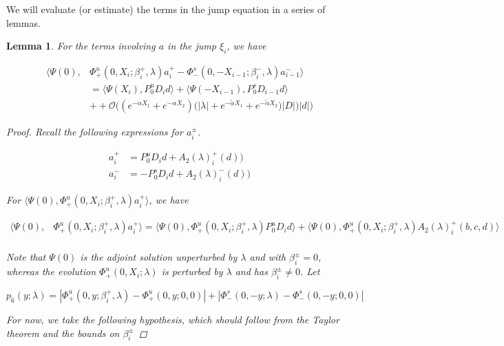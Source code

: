 \documentclass[12pt]{article}
\newtheorem{lemma}{Lemma}
\begin{document}
We will evaluate (or estimate) the terms in the jump equation in a series of lemmas.


\begin{lemma}\label{jumpa}
For the terms involving $a$ in the jump $\xi_i$, we have

\begin{align*}
\langle \Psi(0), &\Phi^u_+(0, X_i; \beta_i^+, \lambda)a_i^+ - \Phi^s_-(0, -X_{i-1}; \beta_i^-, \lambda)a_{i-1}^- \rangle \\
&= \langle \Psi(X_i), P^u_0 D_i d \rangle + \langle \Psi(-X_{i-1}), P^s_0 D_{i-1} d \rangle \\
&+ + \mathcal{O}\Big( (e^{-\alpha X_1} + e^{-\alpha X_2}) \Big( |\lambda| + e^{-\tilde{\alpha} X_1} + e^{-\tilde{\alpha} X_2} )|D| \Big)|d| \Big)
\end{align*}

\begin{proof}

Recall the following expressions for $a_i^\pm$.

\begin{align*}
a_i^+ &= P^u_0 D_i d + A_2(\lambda)_i^+(d))\\
a_i^- &= -P^s_0 D_i d + A_2(\lambda)_i^-(d))
\end{align*}

For $\langle \Psi(0), \Phi^u_+(0, X_i; \beta_i^+, \lambda)a_i^+ \rangle$, we have

\begin{align*}
\langle \Psi(0), &\Phi^u_+(0, X_i; \beta_i^+, \lambda) a_i^+ \rangle = \langle \Psi(0), \Phi^u_+(0, X_i; \beta_i^+, \lambda) P^u_0 D_i d \rangle + \langle \Psi(0), \Phi^u_+(0, X_i; \beta_i^+, \lambda) A_2(\lambda)_i^+(b, c, d) \rangle \\
\end{align*} 

Note that $\Psi(0)$ is the adjoint solution unperturbed by $\lambda$ and with $\beta_i^\pm = 0$, whereas the evolution $\Phi^u_+(0, X_i; \lambda)$ is perturbed by $\lambda$ and has $\beta_i^\pm \neq 0$. Let

\begin{equation}\label{p6}
p_6(y; \lambda) = |\Phi^u_+(0, y; \beta_i^+, \lambda) - \Phi^u_+(0, y; 0, 0)| + |\Phi^s_-(0, -y; \lambda) - \Phi^s_-(0, -y; 0, 0)| 
\end{equation}

For now, we take the following hypothesis, which should follow from the Taylor theorem and the bounds on $\beta_i^\pm$


\end{proof}
\end{lemma}
\end{document}
